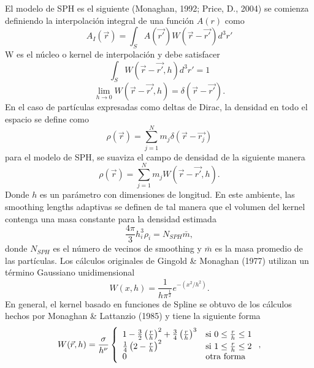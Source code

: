 \documentclass[a4paper,openright,12pt]{book}
\begin{document}
El modelo de SPH es el siguiente (Monaghan, 1992; Price, D., 2004) \cite{b8, b9} se comienza definiendo la interpolación integral de una función $A(r)$ como
\begin{equation}
 A_{I}(\vec{r})
 =
 \int_{S} 
 A(\vec{r'})W(\vec{r}- \vec{r'})d^{3}r'\label{eqn2.21}
\end{equation} 
W es el núcleo o kernel de interpolación y debe satisfacer
\begin{equation}
 \int_{S}W(\vec{r}- \vec{r'},h)d^{3}r' = 1\label{eqn2.22}
\end{equation}
\begin{equation}
\lim_{h \to 0} W(\vec{r}-\vec{r'},h) = \delta(\vec{r}-\vec{r'}).\label{eqn2.23}
\end{equation}
En el caso de partículas expresadas como deltas de Dirac, la densidad en todo el espacio se define como 
\begin{equation}
 \rho(\vec{r})
 =
 \sum_{j=1}^{N} m_{j}\delta(\vec{r}-\vec{r_{j}})\label{eqn2.24}
\end{equation}
para el modelo de SPH, se suaviza el campo de densidad de la siguiente manera
\begin{equation}
\rho(\vec{r})
=
\sum_{j=1}^{N} m_{j} W(\vec{r}-\vec{r'},h).\label{eqn2.25}
\end{equation}
Donde $h$ es un parámetro con dimensiones de longitud.
En este ambiente, las smoothing lengths adaptivas se definen de tal manera que el volumen del kernel contenga una masa constante para la densidad estimada
\begin{equation}
\frac{4 \pi }{3}h_{i}^{3}\rho_{i}
= N_{SPH}\bar{m},\label{eqn2.26}
\end{equation} 
donde $N_{SPH}$ es el número de vecinos de smoothing y $\bar{m}$ es la masa promedio de las partículas. Los cálculos originales de Gingold \& Monaghan (1977) \cite{b9.1} utilizan un término Gaussiano unidimensional
\begin{equation}
  W(x,h)
  =
  \frac{1}{h \pi^{\frac{1}{2}}} e^{-(x^{2}/h^{2})}.\label{eqn2.27}
\end{equation}
En general, el kernel basado en funciones de Spline se obtuvo de los cálculos hechos por Monaghan \& Lattanzio (1985) \cite{b8.1} y tiene la siguiente forma
\begin{equation}
W(\vec{r},h) = \frac{\sigma}{h^{\nu}} \left\lbrace
\begin{array}{ll}
1 - \frac{3}{2}\left(\frac{r}{h}\right)^{2} + \frac{3}{4}\left(\frac{r}{h}\right)^{3} & \textup{si } 0 \leq \frac{r}{h} \leq 1 \\
\frac{1}{4}\left(2-\frac{r}{h}\right)^{2} & \textup{si } 1 \leq \frac{r}{h} \leq 2 \\
0 & \textup{otra forma }
\end{array} 
\right., \label{eqn2.28}
\end{equation}
\end{document}
